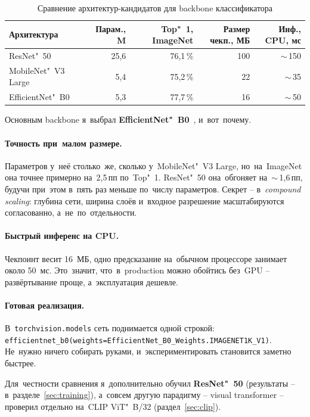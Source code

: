\documentclass[a4paper,12pt]{diplom}
\begin{document}
\begin{table}[!ht]
\caption{Сравнение архитектур-кандидатов для backbone классификатора}
\label{tab:arch}
\centering
\begin{tabular}{lrrrr}
\toprule
\textbf{Архитектура} & \textbf{Парам., M} & \textbf{Top"~1, ImageNet} & \textbf{Размер чекп., МБ} & \textbf{Инф., CPU, мс} \\
\midrule
ResNet"~50~\cite{He:2016}            & 25{,}6 & 76{,}1\,\% & 100 & $\sim$\,150 \\
MobileNet"~V3 Large~\cite{Howard:2019}   & 5{,}4  & 75{,}2\,\% & 22  & $\sim$\,35  \\
EfficientNet"~B0      & 5{,}3  & 77{,}7\,\% & 16  & $\sim$\,50  \\
\bottomrule
\end{tabular}
\end{table}

Основным backbone я~выбрал \textbf{EfficientNet"~B0}~\cite{Tan:2019}, и~вот~почему.

\paragraph{Точность при~малом размере.} Параметров у~неё столько~же, сколько у~MobileNet"~V3 Large, но~на~ImageNet она точнее примерно на~2{,}5\,пп по~Top"~1. ResNet"~50 она~обгоняет на~$\sim$\,1{,}6\,пп, будучи при~этом в~пять раз меньше по~числу параметров. Секрет -- в~\emph{compound scaling}: глубина сети, ширина слоёв и~входное разрешение масштабируются согласованно, а~не~по~отдельности.

\paragraph{Быстрый инференс на CPU.} Чекпоинт весит 16~МБ, одно предсказание на~обычном процессоре занимает около 50~мс. Это~значит, что~в~production можно обойтись без~GPU -- развёртывание проще, а~эксплуатация дешевле.

\paragraph{Готовая реализация.} В~\texttt{torchvision.models} сеть поднимается одной строкой: \verb|efficientnet_b0(weights=EfficientNet_B0_Weights.IMAGENET1K_V1)|. Не~нужно ничего собирать руками, и~экспериментировать становится заметно быстрее.

Для~честности сравнения я~дополнительно обучил \textbf{ResNet"~50} (результаты -- в~разделе~\ref{sec:training}), а~совсем другую парадигму -- visual transformer -- проверил отдельно на~CLIP ViT"~B/32 (раздел~\ref{sec:clip}).
\end{document}
